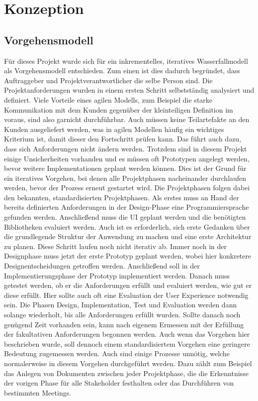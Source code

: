 \chapter{Konzeption}\label{chapter4}

\section{Vorgehensmodell}
Für dieses Projekt wurde sich für ein inkrementelles, iteratives Wasserfallmodell als Vorgehensmodell entschieden. Zum einen ist dies dadurch begründet, dass Auftraggeber und Projektverantwortlicher die selbe Person sind. Die Projektanforderungen wurden in einem ersten Schritt selbstständig analysiert und definiert. Viele Vorteile eines agilen Modells, zum Beispiel die starke Kommunikation mit dem Kunden gegenüber der kleinteiligen Definition im voraus, sind also garnicht durchführbar. Auch müssen keine Teilartefakte an den Kunden ausgeliefert werden, was in agilen Modellen häufig ein wichtiges Kriterium ist, damit dieser den Fortschritt prüfen kann. Das führt auch dazu, dass sich Anforderungen nicht ändern werden. Trotzdem sind in diesem Projekt einige Unsicherheiten vorhanden und es müssen oft Prototypen angelegt werden, bevor weitere Implementationen geplant werden können. Dies ist der Grund für ein iteratives Vorgehen, bei denen alle Projektphasen nacheinander durchlaufen werden, bevor der Prozess erneut gestartet wird. Die Projektphasen folgen dabei den bekannten, standardisierten Projektphasen.   Als erstes muss an Hand der bereits definierten Anforderungen in der Design-Phase eine Programmiersprache gefunden werden. Anschließend muss die UI geplant werden und die benötigten Bibliotheken evaluiert werden. Auch ist es erforderlich, sich erste Gedanken über die grundlegende Struktur der Anwendung zu machen und eine erste Architektur zu planen. Diese Schritt laufen noch nicht iterativ ab. Immer noch in der Designphase muss jetzt der erste Prototyp geplant werden, wobei hier konkretere Designentscheidungen getroffen werden. Anschließend soll in der Implementierungsphase der Prototyp implementiert werden. Danach muss getestet werden, ob er die Anforderungen erfüllt und evaluiert werden, wie gut er diese erfüllt. Hier sollte auch oft eine Evaluation der User Experience notwendig sein. Die Phasen Design, Implementation, Test und Evaluation werden dann solange wiederholt, bis alle Anforderungen erfüllt wurden. Sollte danach noch genügend Zeit vorhanden sein, kann nach eigenem Ermessen mit der Erfüllung der fakultativen Anforderungen begonnen werden. Auch wenn das Vorgehen hier beschrieben wurde, soll dennoch einem standardisiertem Vorgehen eine geringere Bedeutung zugemessen werden. Auch sind einige Prozesse unnötig, welche normalerweise in diesem Vorgehen durchgeführt werden. Dazu zählt zum Beispiel das Anlegen von Dokumenten zwischen jeder Projektphase, die die Erkenntnisse der vorigen Phase für alle Stakeholder festhalten oder das Durchführen von bestimmten Meetings.

